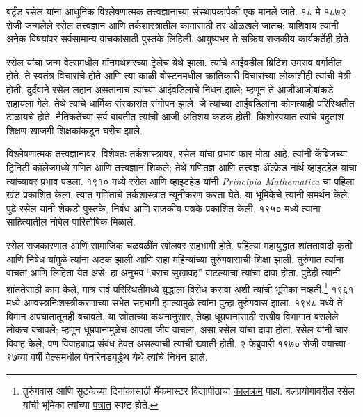 \documentclass[../../../include/open-logic-section]{subfiles}
\begin{document}



बर्ट्रंड रसेल यांना आधुनिक विश्लेषणात्मक तत्त्वज्ञानाच्या संस्थापकांपैकी एक मानले जाते. १८ मे १८७२ रोजी जन्मलेले रसेल तत्त्वज्ञान आणि तर्कशास्त्रातील कामासाठी तर ओळखले जातच; याशिवाय त्यांनी अनेक विषयांवर सर्वसामान्य वाचकांसाठी पुस्तके लिहिली. आयुष्यभर ते सक्रिय राजकीय कार्यकर्तेही होते.

रसेल यांचा जन्म वेल्समधील मॉनमथशरच्या ट्रेलेच येथे झाला. त्यांचे आईवडील ब्रिटिश उमराव वर्गातील होते. ते स्वतंत्र विचारांचे होते आणि त्या काळी बोस्टनमधील क्रांतिकारी विचारांच्या लोकांशीही त्यांची मैत्री होती. दुर्दैवाने रसेल लहान असतानाच त्यांच्या आईवडिलांचे निधन झाले; म्हणून ते आजीआजोबांकडे राहायला गेले. तेथे त्यांचे धार्मिक संस्कारांत संगोपन झाले, जे त्यांच्या आईवडिलांना कोणत्याही परिस्थितीत टाळायचे होते. नैतिकतेच्या सर्व बाबतीत त्यांची आजी अतिशय कडक होती. किशोरवयात त्यांचे बहुतांश शिक्षण खाजगी शिक्षकांकडून घरीच झाले.

विश्लेषणात्मक तत्त्वज्ञानावर, विशेषतः तर्कशास्त्रावर, रसेल यांचा प्रभाव फार मोठा आहे. त्यांनी केंब्रिजच्या ट्रिनिटी कॉलेजमध्ये गणित आणि तत्त्वज्ञान शिकले; तेथे गणितज्ञ आणि तत्त्वज्ञ ॲल्फ्रेड नॉर्थ व्हाइटहेड यांचा त्यांच्यावर प्रभाव पडला. १९१० मध्ये रसेल आणि व्हाइटहेड यांनी \emph{Principia Mathematica} चा पहिला खंड प्रकाशित केला. त्यात गणिताचे तर्कशास्त्रात न्यूनीकरण करता येते, या भूमिकेचे त्यांनी समर्थन केले. पुढे रसेल यांनी शेकडो पुस्तके, निबंध आणि राजकीय पत्रके प्रकाशित केली. १९५० मध्ये त्यांना साहित्यातील नोबेल पारितोषिक मिळाले.

रसेल राजकारणात आणि सामाजिक चळवळींत खोलवर सहभागी होते. पहिल्या महायुद्धात शांततावादी कृती आणि निषेध यांमुळे त्यांना अटक झाली आणि सहा महिन्यांच्या तुरुंगवासाची शिक्षा झाली. तुरुंगात त्यांना वाचता आणि लिहिता येत असे; हा अनुभव “बराच सुखावह” वाटल्याचा त्यांचा दावा होता. पुढेही त्यांनी शांततेसाठी काम केले, मात्र सर्व परिस्थितींमध्ये युद्धाला विरोध करावा अशी त्यांची भूमिका नव्हती.\footnote{तुरुंगवास आणि सुटकेच्या दिनांकासाठी मॅकमास्टर विद्यापीठाचा \href{https://russell-letters.mcmaster.ca/chronology}{कालक्रम} पाहा. बलप्रयोगावरील रसेल यांची भूमिका त्यांच्या \href{https://bracers.mcmaster.ca/30909}{पत्रात} स्पष्ट होते.} १९६१ मध्ये अण्वस्त्रनिःशस्त्रीकरणाच्या सभेत सहभागी झाल्यामुळे त्यांना पुन्हा तुरुंगवास झाला. १९४८ मध्ये ते विमान अपघातातूनही बचावले. या स्रोताच्या कथनानुसार, तेव्हा धूम्रपानासाठी राखीव विभागात बसलेले लोकच बचावले; म्हणून धूम्रपानामुळेच आपला जीव वाचला, असा रसेल यांचा दावा होता. रसेल यांनी चार विवाह केले, पण विवाहबाह्य संबंध ठेवत असल्याची त्यांची ख्याती होती. २ फेब्रुवारी १९७० रोजी वयाच्या ९७व्या वर्षी वेल्समधील पेनरिनड्यूड्रेथ येथे त्यांचे निधन झाले.
\end{document}
